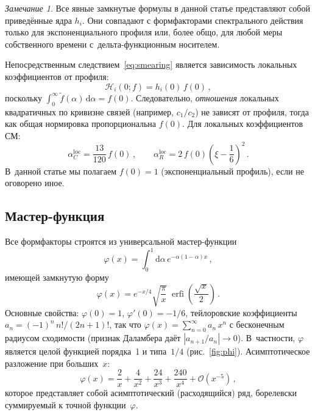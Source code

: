 \documentclass[aps,prd,twocolumn,superscriptaddress,nofootinbib,floatfix]{revtex4-2}
\theoremstyle{definition}
\theoremstyle{remark}
\newtheorem{remark}[theorem]{\cyrillicfont Замечание}
\newcommand{\dd}{\mathrm{d}}
\newcommand{\erfi}{\operatorname{erfi}}
\begin{document}
\begin{remark}
Все явные замкнутые формулы в данной статье представляют собой приведённые
ядра $h_i$. Они совпадают с формфакторами спектрального действия только
для экспоненциального профиля или, более общо, для любой меры собственного
времени с~дельта-функционным носителем.
\end{remark}

Непосредственным следствием~\eqref{eq:smearing} является зависимость
локальных коэффициентов от профиля:
\begin{equation}
  \mathcal{H}_i(0;f) = h_i(0)\,f(0)\,,
  \label{eq:f0-factor}
\end{equation}
поскольку $\int_0^\infty \tilde{f}(\alpha)\,\dd\alpha = f(0)$.
Следовательно, \emph{отношения} локальных квадратичных по кривизне
связей (например, $c_1/c_2$) не зависят от профиля, тогда как общая
нормировка пропорциональна $f(0)$. Для локальных коэффициентов СМ:
\begin{equation}
  \alpha_C^{\text{loc}} = \frac{13}{120}\,f(0)\,,\qquad
  \alpha_R^{\text{loc}} = 2\,f(0)\!\left(\xi - \frac{1}{6}\right)^{\!2}\,.
  \label{eq:alphaC-local-f}
\end{equation}
В~данной статье мы полагаем $f(0) = 1$ (экспоненциальный профиль), если не
оговорено иное.

\subsection{Мастер-функция}

Все формфакторы строятся из универсальной мастер-функции
\begin{equation}
  \varphi(x) = \int_0^1 \dd\alpha\, e^{-\alpha(1-\alpha)x}\,,
  \label{eq:phi-def}
\end{equation}
имеющей замкнутую форму
\begin{equation}
  \varphi(x) = e^{-x/4}\sqrt{\frac{\pi}{x}}\;\erfi\!\left(\frac{\sqrt{x}}{2}\right)\,.
  \label{eq:phi-closed}
\end{equation}
Основные свойства:
$\varphi(0) = 1$,
$\varphi'(0) = -1/6$,
тейлоровские коэффициенты $a_n = (-1)^n\,n!/(2n+1)!$, так что
$\varphi(x) = \sum_{n=0}^\infty a_n\,x^n$ с бесконечным радиусом
сходимости (признак Даламбера даёт $|a_{n+1}/a_n| \to 0$). В~частности,
$\varphi$ является целой функцией порядка~1 и типа~$1/4$
(рис.~\ref{fig:phi}). Асимптотическое разложение при больших~$x$:
\begin{equation}
  \varphi(x) = \frac{2}{x} + \frac{4}{x^2} + \frac{24}{x^3}
    + \frac{240}{x^4} + \mathcal{O}(x^{-5})\,,
  \label{eq:phi-uv}
\end{equation}
которое представляет собой асимптотический (расходящийся) ряд,
борелевски суммируемый к точной функции~$\varphi$.
\end{document}
